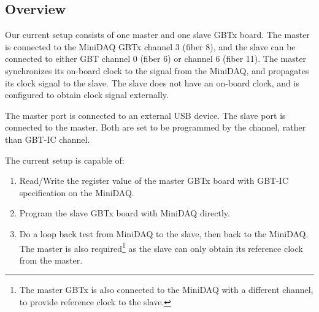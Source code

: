 \subsection{Overview}
Our current setup consists of one master and one slave GBTx board.
The master is connected to the MiniDAQ GBTx channel 3 (fiber 8),
and the slave can be connected to either GBT channel 0 (fiber 6) or channel 6
(fiber 11).
The master synchronizes its on-board clock to the signal from the MiniDAQ,
and propagates its clock signal to the slave.
The slave does not have an on-board clock,
and is configured to obtain clock signal externally.

The master \itwoc port is connected to an external USB device.
The slave \itwoc port is connected to the master.
Both are set to be programmed by the \itwoc channel,
rather than GBT-IC channel.

The current setup is capable of:
\begin{enumerate}
    \item Read/Write the register value of the master GBTx board with GBT-IC
        specification on the MiniDAQ.
    \item Program the slave GBTx board with MiniDAQ directly.
    \item Do a loop back test from MiniDAQ to the slave, then back to the
        MiniDAQ.
        The master is also required\footnote{
            The master GBTx is also connected to the MiniDAQ with a different
        channel, to provide reference clock to the slave.}
        as the slave can only obtain its reference clock from the master.
\end{enumerate}
